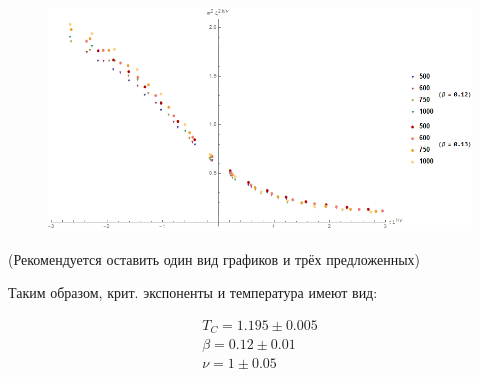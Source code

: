\begin{figure}[!h]
    \centering
    \includegraphics[width=150mm]{Sections/Images/ErrB2_3.png}
    \label{fig:DatColM2_3}
\end{figure}

(Рекомендуется оставить один вид графиков и трёх предложенных)

Таким образом, крит. экспоненты и температура имеют вид:

\begin{align*}
    T_{C} = 1.195 \pm 0.005 \\
    \beta = 0.12 \pm 0.01 \\
    \nu = 1 \pm 0.05
\end{align*}